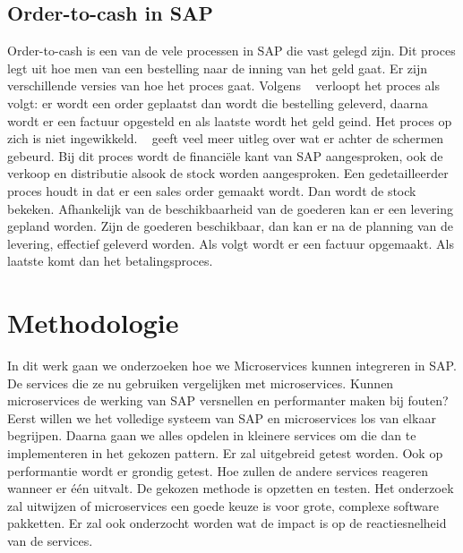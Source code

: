 \subsection{Order-to-cash in SAP}
Order-to-cash is een van de vele processen in SAP die vast gelegd zijn. Dit proces legt uit hoe men van een bestelling naar de inning van het geld gaat. Er zijn verschillende versies van hoe het proces gaat. Volgens ~\cite{Akthar2018} verloopt het proces als volgt: er wordt een order geplaatst dan wordt die bestelling geleverd, daarna wordt er een factuur opgesteld en als laatste wordt het geld geind. Het proces op zich is niet ingewikkeld. ~\cite{OpenSap2018} geeft veel meer uitleg over wat er achter de schermen gebeurd. Bij dit proces wordt de financiële kant van SAP aangesproken, ook de verkoop en distributie alsook de stock worden aangesproken. Een gedetailleerder proces houdt in dat er een sales order gemaakt wordt. Dan wordt de stock bekeken. Afhankelijk van de beschikbaarheid van de goederen kan er een levering gepland worden. Zijn de goederen beschikbaar, dan kan er na de planning van de levering, effectief geleverd worden. Als volgt wordt er een factuur opgemaakt. Als laatste komt dan het betalingsproces. 


\section{Methodologie}
\label{sec:methodologie}
In dit werk gaan we onderzoeken hoe we Microservices kunnen integreren in SAP. De services die ze nu gebruiken vergelijken met microservices. Kunnen microservices de werking van SAP versnellen en performanter maken bij fouten?
Eerst willen we het volledige systeem van SAP en microservices los van elkaar begrijpen. Daarna gaan we alles opdelen in kleinere services om die dan te implementeren in het gekozen pattern. Er zal uitgebreid getest worden. Ook op performantie wordt er grondig getest. Hoe zullen de andere services reageren wanneer er één uitvalt. De gekozen methode is opzetten en testen. 
Het onderzoek zal uitwijzen of microservices een goede keuze is voor grote, complexe software pakketten. 
Er zal ook onderzocht worden wat de impact is op de reactiesnelheid van de services.


